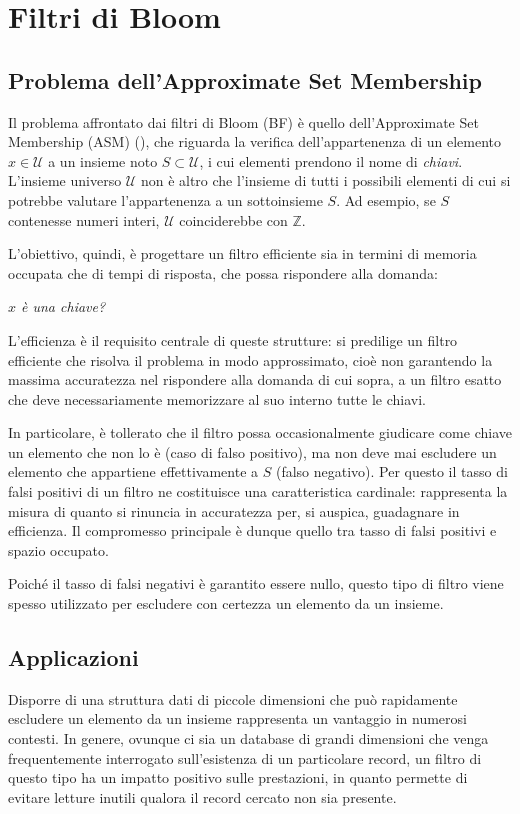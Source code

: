 \chapter{Filtri di Bloom}

\section{Problema dell'Approximate Set Membership}
Il problema affrontato dai filtri di Bloom (BF) è quello dell'Approximate Set Membership (ASM) (\cite{bloom1970}), che riguarda la verifica dell'appartenenza di un elemento $x \in \mathcal{U}$ a un insieme noto $S \subset \mathcal{U}$, i cui elementi prendono il nome di \textit{chiavi}. L'insieme universo $\mathcal{U}$ non è altro che l'insieme di tutti i possibili elementi di cui si potrebbe valutare l'appartenenza a un sottoinsieme $S$. Ad esempio, se $S$ contenesse numeri interi, $\mathcal{U}$ coinciderebbe con $\mathbb{Z}$. 

L'obiettivo, quindi, è progettare un filtro efficiente sia in termini di memoria occupata che di tempi di risposta, che possa rispondere alla domanda:  
\begin{center}
    \textit{$x$ è una chiave?}
\end{center}
L'efficienza è il requisito centrale di queste strutture: si predilige un filtro efficiente che risolva il problema in modo approssimato, cioè non garantendo la massima accuratezza nel rispondere alla domanda di cui sopra, a un filtro esatto che deve necessariamente memorizzare al suo interno tutte le chiavi.

In particolare, è tollerato che il filtro possa occasionalmente giudicare come chiave un elemento che non lo è (caso di falso positivo), ma non deve mai escludere un elemento che appartiene effettivamente a $S$ (falso negativo). Per questo il tasso di falsi positivi di un filtro ne costituisce una caratteristica cardinale: rappresenta la misura di quanto si rinuncia in accuratezza per, si auspica, guadagnare in efficienza. Il compromesso principale è dunque quello tra tasso di falsi positivi e spazio occupato.

Poiché il tasso di falsi negativi è garantito essere nullo, questo tipo di filtro viene spesso utilizzato per escludere con certezza un elemento da un insieme.

\section{Applicazioni}
Disporre di una struttura dati di piccole dimensioni che può rapidamente escludere un elemento da un insieme rappresenta un vantaggio in numerosi contesti. In genere, ovunque ci sia un database di grandi dimensioni che venga frequentemente interrogato sull'esistenza di un particolare record, un filtro di questo tipo ha un impatto positivo sulle prestazioni, in quanto permette di evitare letture inutili qualora il record cercato non sia presente.

